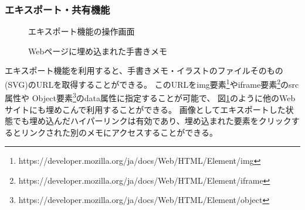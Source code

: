 \subsubsection{エキスポート・共有機能}

\begin{figure}[htbp] \begin{minipage}{0.5\hsize}
                         \begin{center} 
                         \end{center} \caption{エキスポート機能の操作画面} \label{fig:exporting1}
\end{minipage} \begin{minipage}{0.5\hsize}
                   \begin{center} 
                   \end{center} \caption{Webページに埋め込まれた手書きメモ} \label{fig:exporting2}
\end{minipage}
\end{figure}
エキスポート機能を利用すると、手書きメモ・イラストのファイルそのもの(SVG)のURLを取得することができる。
このURLをimg要素\footnote{https://developer.mozilla.org/ja/docs/Web/HTML/Element/img}やiframe要素\footnote{https://developer.mozilla.org/ja/docs/Web/HTML/Element/iframe}のsrc属性や
Object要素\footnote{https://developer.mozilla.org/ja/docs/Web/HTML/Element/object}のdata属性に指定することが可能で、
図\ref{fig:exporting2}のように他のWebサイトにも埋めこんで利用することができる。
画像としてエキスポートした状態でも埋め込んだハイパーリンクは有効であり、埋め込まれた要素をクリックするとリンクされた別のメモにアクセスすることができる。


